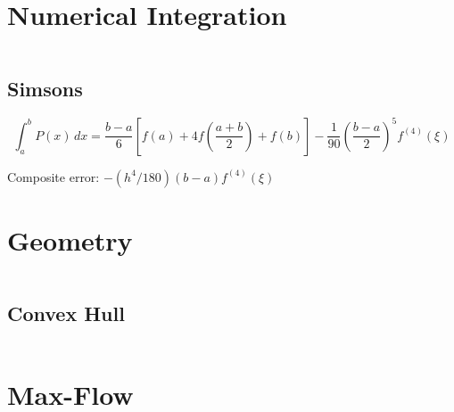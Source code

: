 \documentclass[a4paper]{article}
\begin{document}
\section{Numerical Integration}
\inputminted{cpp}{numerical-integration.cpp}

\subsection{Simsons}


\[
\int_a^bP(x)\,dx =\frac{b-a}{6} \left[f(a) + 4 f \left( \frac{a + b}{2} \right) + f ( b )
  \right]
-\frac{1}{90}\left(\frac{b - a}{2}\right)^5f^{(4)}(\xi)\]

Composite error: $-(h^4/180)(b - a)f^{(4)}(\xi)$


\section{Geometry}

\inputminted{cpp}{geom.cpp}

\subsection{Convex Hull}

\inputminted{cpp}{convexhull.cpp}

\section{Max-Flow}

\inputminted{text}{maxflow.txt}

\inputminted{cpp}{maxflow.cpp}
\end{document}
